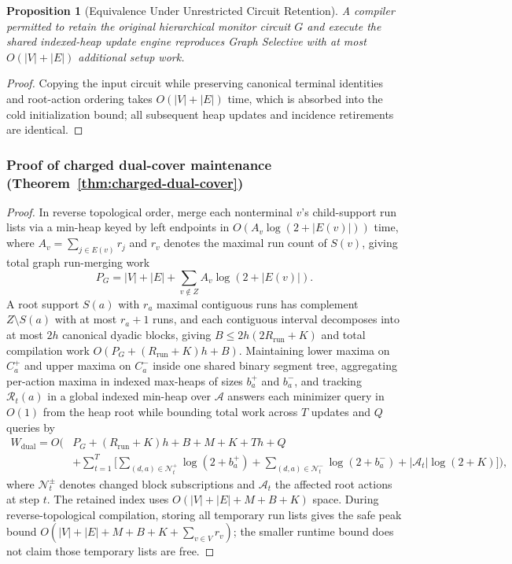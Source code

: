 \documentclass{article}
\theoremstyle{plain}
\newtheorem{proposition}[theorem]{Proposition}
\theoremstyle{definition}
\begin{document}
\begin{proposition}[Equivalence Under Unrestricted Circuit Retention]
\label{prop:unrestricted-compiler}
A compiler permitted to retain the original hierarchical monitor circuit $G$ and execute the shared indexed-heap update engine reproduces \emph{Graph Selective} with at most $O(|V| + |E|)$ additional setup work.
\end{proposition}

\begin{proof}
Copying the input circuit while preserving canonical terminal identities and root-action ordering takes $O(|V| + |E|)$ time, which is absorbed into the cold initialization bound; all subsequent heap updates and incidence retirements are identical.
\end{proof}


\subsubsection{Proof of charged dual-cover maintenance (Theorem~\ref{thm:charged-dual-cover})}

\begin{proof}
In reverse topological order, merge each nonterminal $v$'s child-support run lists via a min-heap keyed by left endpoints in $O(A_v\log(2+|E(v)|))$ time, where $A_v=\sum_{j\in E(v)}r_j$ and $r_v$ denotes the maximal run count of $S(v)$, giving total graph run-merging work
\begin{equation}
 P_G=|V|+|E|+\sum_{v\notin Z}A_v\log(2+|E(v)|).
 \label{eq:dual-run-compilation}
\end{equation}
A root support $S(a)$ with $r_a$ maximal contiguous runs has complement $Z\setminus S(a)$ with at most $r_a+1$ runs, and each contiguous interval decomposes into at most $2h$ canonical dyadic blocks, giving $B\le 2h(2R_{\mathrm{run}}+K)$ and total compilation work $O(P_G+(R_{\mathrm{run}}+K)h+B)$. Maintaining lower maxima on $C_a^+$ and upper maxima on $C_a^-$ inside one shared binary segment tree, aggregating per-action maxima in indexed max-heaps of sizes $b_a^+$ and $b_a^-$, and tracking $\mathcal R_t(a)$ in a global indexed min-heap over $\mathcal A$ answers each minimizer query in $O(1)$ from the heap root while bounding total work across $T$ updates and $Q$ queries by
\begin{align}
 W_{\mathrm{dual}}=O\Bigg(&P_G+(R_{\mathrm{run}}+K)h+B+M+K+Th+Q\nonumber\\[-2pt]
 &+\sum_{t=1}^T\Big[\sum_{(d,a)\in\mathcal N_t^+}\log(2+b_a^+)
 +\sum_{(d,a)\in\mathcal N_t^-}\log(2+b_a^-)
 +|\mathcal A_t|\log(2+K)\Big]\Bigg),
 \label{eq:dual-cover-work}
\end{align}
where $\mathcal N_t^\pm$ denotes changed block subscriptions and $\mathcal A_t$ the affected root actions at step $t$.
The retained index uses $O(|V|+|E|+M+B+K)$ space. During reverse-topological
compilation, storing all temporary run lists gives the safe peak bound
$O(|V|+|E|+M+B+K+\sum_{v\in V}r_v)$; the smaller runtime bound does not
claim those temporary lists are free.
\end{proof}
\end{document}
